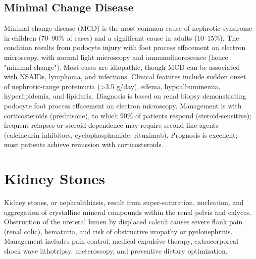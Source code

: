 \subsection{Minimal Change Disease}
\label{sec:Minimal Change Disease}
Minimal change disease (MCD) is the most common cause of nephrotic syndrome in children (70--90\% of cases) and a significant cause in adults (10--15\%). The condition results from podocyte injury with foot process effacement on electron microscopy, with normal light microscopy and immunofluorescence (hence "minimal change"). Most cases are idiopathic, though MCD can be associated with NSAIDs, lymphoma, and infections. Clinical features include sudden onset of nephrotic-range proteinuria (>3.5 g/day), edema, hypoalbuminemia, hyperlipidemia, and lipiduria. Diagnosis is based on renal biopsy demonstrating podocyte foot process effacement on electron microscopy. Management is with corticosteroids (prednisone), to which 90\% of patients respond (steroid-sensitive); frequent relapses or steroid dependence may require second-line agents (calcineurin inhibitors, cyclophosphamide, rituximab). Prognosis is excellent; most patients achieve remission with corticosteroids.

\section{Kidney Stones}




Kidney stones, or nephrolithiasis, result from super-saturation, nucleation, and aggregation of crystalline mineral compounds within the renal pelvis and calyces. Obstruction of the ureteral lumen by displaced calculi causes severe flank pain (renal colic), hematuria, and risk of obstructive uropathy or pyelonephritis. Management includes pain control, medical expulsive therapy, extracorporeal shock wave lithotripsy, ureteroscopy, and preventive dietary optimization.



